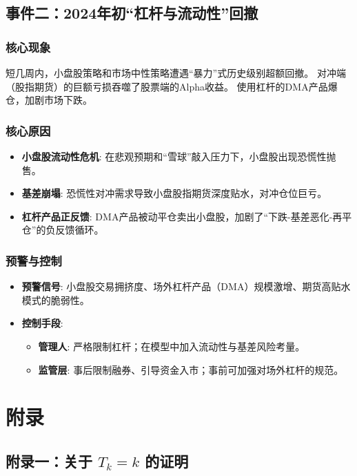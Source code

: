 \documentclass[UTF8]{ctexart}
\begin{document}
\subsection*{事件二：2024年初“杠杆与流动性”回撤}

\subsubsection*{核心现象}

 短几周内，小盘股策略和市场中性策略遭遇“暴力”式历史级别超额回撤。
对冲端（股指期货）的巨额亏损吞噬了股票端的Alpha收益。
使用杠杆的DMA产品爆仓，加剧市场下跌。


\subsubsection*{核心原因}
\begin{itemize}
    \item \textbf{小盘股流动性危机}: 在悲观预期和“雪球”敲入压力下，小盘股出现恐慌性抛售。
    \item \textbf{基差崩塌}: 恐慌性对冲需求导致小盘股指期货深度贴水，对冲仓位巨亏。
    \item \textbf{杠杆产品正反馈}: DMA产品被动平仓卖出小盘股，加剧了“下跌-基差恶化-再平仓”的负反馈循环。
\end{itemize}

\subsubsection*{预警与控制}
\begin{itemize}
    \item \textbf{预警信号}: 小盘股交易拥挤度、场外杠杆产品（DMA）规模激增、期货高贴水模式的脆弱性。
    \item \textbf{控制手段}:
    \begin{itemize}
        \item \textbf{管理人}: 严格限制杠杆；在模型中加入流动性与基差风险考量。
        \item \textbf{监管层}: 事后限制融券、引导资金入市；事前可加强对场外杠杆的规范。
    \end{itemize}
\end{itemize}


\section*{附录}

\subsection*{附录一：关于 $T_k=k$ 的证明}
\end{document}
